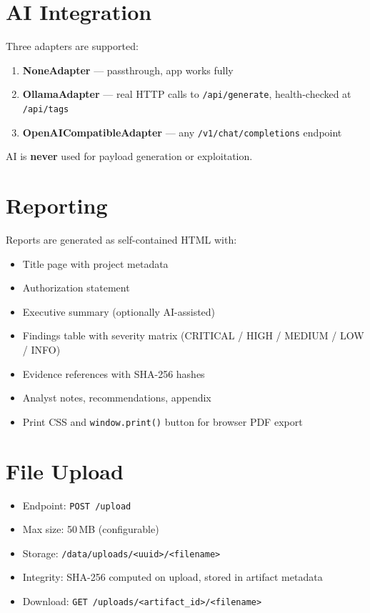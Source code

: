 \documentclass[11pt,a4paper]{article}
\begin{document}
\section{AI Integration}
Three adapters are supported:
\begin{enumerate}
  \item \textbf{NoneAdapter} --- passthrough, app works fully
  \item \textbf{OllamaAdapter} --- real HTTP calls to \texttt{/api/generate},
        health-checked at \texttt{/api/tags}
  \item \textbf{OpenAICompatibleAdapter} --- any \texttt{/v1/chat/completions}
        endpoint
\end{enumerate}
AI is \textbf{never} used for payload generation or exploitation.

\section{Reporting}
Reports are generated as self-contained HTML with:
\begin{itemize}
  \item Title page with project metadata
  \item Authorization statement
  \item Executive summary (optionally AI-assisted)
  \item Findings table with severity matrix (CRITICAL / HIGH / MEDIUM / LOW / INFO)
  \item Evidence references with SHA-256 hashes
  \item Analyst notes, recommendations, appendix
  \item Print CSS and \texttt{window.print()} button for browser PDF export
\end{itemize}

\section{File Upload}
\begin{itemize}
  \item Endpoint: \texttt{POST /upload}
  \item Max size: 50\,MB (configurable)
  \item Storage: \texttt{/data/uploads/<uuid>/<filename>}
  \item Integrity: SHA-256 computed on upload, stored in artifact metadata
  \item Download: \texttt{GET /uploads/<artifact\_id>/<filename>}
\end{itemize}
\end{document}

